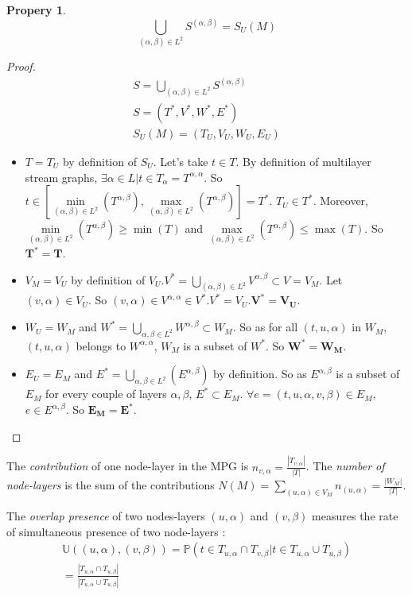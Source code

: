 \documentclass[dvipsnames,a4paper,11pt]{article}
\newtheorem{prop}{Propery}
\theoremstyle{definition}
\theoremstyle{remark}
\theoremstyle{remark}
\begin{document}
	\begin{prop}
		\[
			\bigcup_{(\alpha,\beta) \in L^2} S^{(\alpha,\beta)} = S_U(M)
		\]
	\end{prop}
	\begin{proof}
		\begin{align*}
			S=\bigcup_{(\alpha,\beta) \in L^2} S^{(\alpha,\beta)}\\
			S=(T^{*},V^{*},W^{*},E^{*})\\
			S_U(M) = (T_U,V_U,W_U,E_U)			
		\end{align*}		 
	
	
	\begin{itemize}
		\item $T=T_U$ by definition of $S_U$. Let's take $t\in T$. By definition of multilayer stream graphs, $\exists \alpha \in L | t\in T_{\alpha}=T^{\alpha,\alpha}$. So $t \in [\underset{(\alpha,\beta) \in L^2}{\min}(T^{\alpha,\beta}),\underset{(\alpha,\beta) \in L^2}{\max}(T^{\alpha,\beta})]=T^{*}$. $T_U \in T^{*}$. 
	Moreover, $\underset{(\alpha,\beta) \in L^2}{\min}(T^{\alpha,\beta}) \geq \min(T)$ 
	and $\underset{(\alpha,\beta) \in L^2}{\max}(T^{\alpha,\beta}) \leq \max(T)$. 
	So $\mathbf{T^{*} = T}$.
		\item  $V_M = V_U$ by definition of $V_U$.$V^{*}=\bigcup_{(\alpha,\beta) \in L^2} V^{\alpha,\beta} \subset V = V_M$.
	Let $(v,\alpha) \in V_U$. So $(v,\alpha) \in V^{\alpha,\alpha} \in V^{*}$.$V^{*}=V_U$.$\mathbf{V^{*}=V_U}$.
		\item $W_U=W_M$ and $W^{*}=\bigcup_{\alpha,\beta \in L^2} W^{\alpha,\beta} \subset W_M$. So as for all $ (t,u,\alpha)$ in $W_M$, $(t,u,\alpha)$ belongs to $W^{\alpha,\alpha}$, $W_M$ is a subset of $W^{*}$. So $\mathbf{W^{*}=W_M}$.
		\item $E_U=E_M$ and $E^{*}=\bigcup_{\alpha,\beta \in L^2}(E^{\alpha,\beta})$ by definition. So as $E^{\alpha,\beta}$ is a subset of $E_M$ for every couple of layers $\alpha,\beta$, $E^{*} \subset E_M$. 
		$\forall e =(t,u,\alpha,v,\beta) \in E_M$, $e \in E^{\alpha,\beta}$. So $\mathbf{E_M=E^{*}}$.
	\end{itemize}		
	\end{proof}



    The {\em contribution} of one node-layer in the MPG is $n_{v,\alpha} = \frac{|T_{v,\alpha}|}{|T|}$. The {\em number of node-layers} is the sum of the contributions $N(M) = \underset{(u,\alpha)\in V_M}{\sum} n_{(u,\alpha)} = \frac{|W_M|}{|T|}$.

	The {\em overlap presence } of two nodes-layers $(u,\alpha)$ and $(v,\beta)$ measures the rate of simultaneous presence of two node-layers :
	\begin{align*}
		\mathbb{U}((u,\alpha),(v,\beta))=\mathbb{P}( t \in T_{u,\alpha} \cap T_{v,\beta} | t \in T_{u,\alpha} \cup T_{u,\beta}) \\
		= \frac{|T_{u,\alpha}\cap T_{u,\beta}|}{|T_{u,\alpha}\cup T_{u,\beta}|}
	\end{align*}
\end{document}
